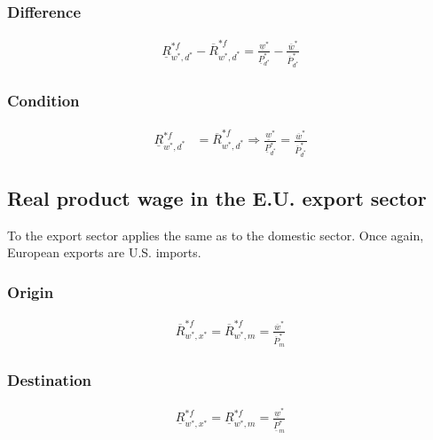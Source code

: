 \subsubsection*{Difference}
\begin{equation}\label{prodweu.diff} 
\begin{aligned}
\underline R^{*f}_{w^*, d^*} - \overline R^{*f}_{w^*, d^*} = \frac{\underline w^*}{\underline P^*_{d^*}} - \frac{\overline w^*}{\overline P^*_{d^*}}
\end{aligned}  
\end{equation}

\subsubsection*{Condition}
\begin{equation}\label{prodweu.con} 
\begin{aligned}
    \underline R^{*f}_{w^*, d^*} &= \overline R^{*f}_{w^*, d^*} \Rightarrow \frac{\underline w^*}{\underline P^*_{d^*}} = \frac{\overline w^*}{\overline P^*_{d^*}}
\end{aligned}  
\end{equation}

\subsection*{Real product wage in the E.U. export sector}
To the export sector applies the same as to the domestic sector. Once again, European exports are U.S. imports.
\subsubsection*{Origin}
\begin{equation}\label{proxweu.o} 
\begin{aligned}
\overline R^{*f}_{w^*, x^*} = \overline R^{*f}_{w^*, m} = \frac{\overline w^*}{\overline P^*_{m}}
\end{aligned}  
\end{equation}

\subsubsection*{Destination}
\begin{equation}\label{proxweu.d}  
\begin{aligned}
\underline R^{*f}_{w^*, x^*} = \underline R^{*f}_{w^*, m} = \frac{\underline w^*}{\underline P^*_{m}}
\end{aligned}  
\end{equation}

